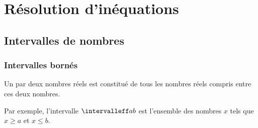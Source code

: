 \documentclass[10pt,openright,twoside,french]{book}
\begin{document}
\section{Résolution d'inéquations}
\subsection{Intervalles de nombres}
\subsubsection{Intervalles bornés}
\begin{Defi}
    Un  par deux nombres réels est constitué de tous les nombres réels compris entre ces deux nombres.\par
    Par exemple, l'intervalle $\intervalleff  a b$ est l'ensemble des nombres $x$ tels que $x \geq a$ et $x \leq b$.
\end{Defi}
\end{document}
